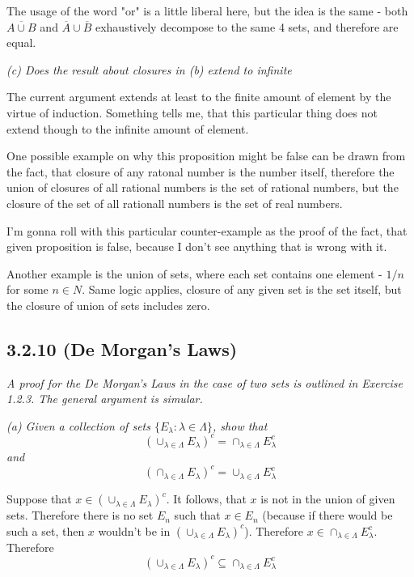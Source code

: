\documentclass[11pt,oneside,titlepage]{book}
\begin{document}
The usage of the word "or" is a little liberal here, but the idea is the same - both
$\overline{A \cup B}$ and $\overline A \cup \overline B$ exhaustively decompose to the same
4 sets, and therefore are equal.

\textit{(c) Does the result about closures in (b) extend to infinite }

The current argument extends at least to the finite amount of element by the virtue of
induction. Something tells me, that this particular thing does not extend though to the
infinite amount of element.

One possible example on why this proposition might be false can be drawn
from the fact, that closure of any
ratonal number is the number itself, therefore the union of closures of all rational numbers is
the set of rational numbers, but the closure of the set of all rationall numbers is the
set of real numbers.

I'm gonna roll with this particular counter-example as the proof of the fact, that given
proposition is false, because I don't see anything that is wrong with it.

Another example  is the union of sets, where each set contains one element - $1/n$ for
some $n \in N$. Same logic applies, closure of any given set is the set itself, but
the closure of union of sets includes zero.


\subsection*{3.2.10 (De Morgan's Laws)}
\textit{A proof for the De Morgan's Laws in the case of two sets is outlined in Exercise 1.2.3.
  The general argument is simular.}

\textit{(a) Given a collection of sets $\{E_\lambda: \lambda \in  \Lambda\}$, show that }
$$\left(\cup_{\lambda \in \Lambda} E_\lambda \right)^c =
\cap_{\lambda \in \Lambda} E_\lambda^c$$
\textit{and}
$$\left(\cap_{\lambda \in \Lambda} E_\lambda \right)^c =
\cup_{\lambda \in \Lambda} E_\lambda^c$$

Suppose that $x \in \left(\cup_{\lambda \in \Lambda} E_\lambda \right)^c$. It
follows, that $x$ is not in the union of given sets. Therefore there is no
set $E_n$ such that $x \in E_n$ (because if there would be such a set, then $x$
wouldn't be in $\left(\cup_{\lambda \in \Lambda} E_\lambda \right)^c$).
Therefore $x \in \cap_{\lambda \in \Lambda} E_\lambda^c$. Therefore 
$$\left(\cup_{\lambda \in \Lambda} E_\lambda \right)^c \subseteq \cap_{\lambda \in \Lambda} E_\lambda^c$$
\end{document}

